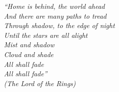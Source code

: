 
\begin{epigrafe}
    \vspace*{\fill}
	\begin{flushright}
		\textit{``Home is behind, the world ahead \\
		And there are many paths to tread \\
		Through shadow, to the edge of night \\
        Until the stars are all alight \\
        \vspace*{0.5cm}
        Mist and shadow \\
        Cloud and shade \\
        All shall fade \\
		All shall fade''\\
		(The Lord of the Rings)}
	\end{flushright}
\end{epigrafe}
